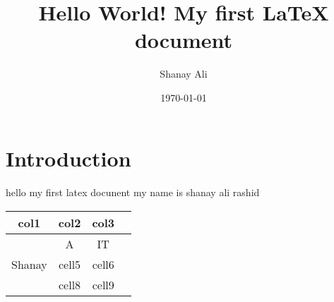 \documentclass[a4paper,12pt]{article}
\begin{document}
\title{Hello World! My first LaTeX document}
\author{Shanay Ali}
\date{\today}
\maketitle

\section{Introduction}

\paragraph{}
hello my first latex docunent my name is shanay ali rashid 
\begin{center}
\begin{tabular}{ |c|c|c|c| } 
\hline
col1 & col2 & col3 \\
\hline
\multirow{3}{4em}{Shanay } & A & IT\\ 
& cell5 & cell6 \\ 
& cell8 & cell9 \\ 
\hline
\end{tabular}
\end{center}
\end{document}

